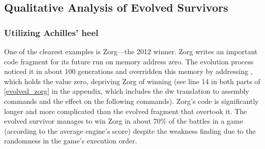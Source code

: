 \documentclass[dvipsnames, format=sigconf]{acmart}
\begin{document}

\subsection{Qualitative Analysis of Evolved Survivors}
\subsubsection{Utilizing Achilles' heel}
One of the clearest examples is Zorg---the 2012 winner. Zorg writes an important code fragment for its future run on memory address zero. The evolution process noticed it in about 100 generations and overridden this memory by addressing , which holds the value zero, depriving Zorg of winning (see line 14 in both parts of \autoref{evolved_zorg} in the appendix, which includes the dw translation to assembly commands and the effect on the following commands). Zorg's code is significantly longer and more complicated than the evolved fragment that overtook it. The evolved survivor manages to win Zorg in about 70\% of the battles in a game (according to the average engine's score) despite the weakness finding due to the randomness in the game's execution order.
\end{document}
